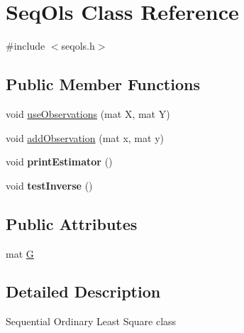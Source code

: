 \hypertarget{classSeqOls}{\section{Seq\-Ols Class Reference}
\label{classSeqOls}
}


{\ttfamily \#include $<$seqols.\-h$>$}

\subsection*{Public Member Functions}
\begin{DoxyCompactItemize}
\item 
void \hyperlink{classSeqOls_a5b9e388947866adbf51efb9324661adb}{use\-Observations} (mat X, mat Y)
\item 
void \hyperlink{classSeqOls_a8da1bf645e17edcb3c91344662e906bf}{add\-Observation} (mat x, mat y)
\item 
\hypertarget{classSeqOls_aff54aeaa5772c770426d25a534aa3682}{void {\bfseries print\-Estimator} ()}\label{classSeqOls_aff54aeaa5772c770426d25a534aa3682}

\item 
\hypertarget{classSeqOls_a5a760f52ef21dcfa183688ebe53a4cdb}{void {\bfseries test\-Inverse} ()}\label{classSeqOls_a5a760f52ef21dcfa183688ebe53a4cdb}

\end{DoxyCompactItemize}
\subsection*{Public Attributes}
\begin{DoxyCompactItemize}
\item 
mat \hyperlink{classSeqOls_a0f9a65cd37a9c61b2a1486e5de62dd13}{G}
\end{DoxyCompactItemize}


\subsection{Detailed Description}
Sequential Ordinary Least Square class 


